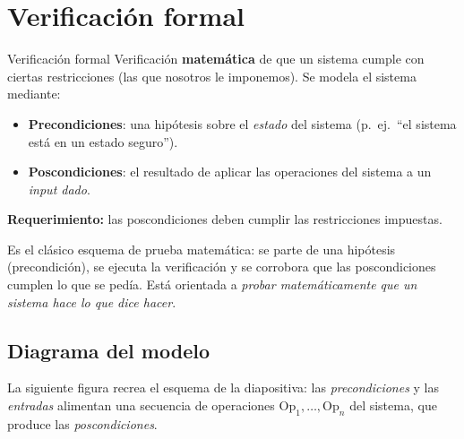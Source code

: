 \documentclass[11pt,a4paper]{article}
\begin{document}
\section{Verificación formal}

\begin{defbox}{Verificación formal}
Verificación \textbf{matemática} de que un sistema cumple con ciertas restricciones
(las que nosotros le imponemos). Se modela el sistema mediante:
\begin{itemize}[leftmargin=1.4em,itemsep=2pt]
  \item \textbf{Precondiciones}: una hipótesis sobre el \emph{estado} del sistema
        (p.\ ej.\ ``el sistema está en un estado seguro'').
  \item \textbf{Poscondiciones}: el resultado de aplicar las operaciones del sistema a un
        \emph{input dado}.
\end{itemize}
\textbf{Requerimiento:} las poscondiciones deben cumplir las restricciones impuestas.
\end{defbox}

Es el clásico esquema de prueba matemática: se parte de una hipótesis (precondición), se
ejecuta la verificación y se corrobora que las poscondiciones cumplen lo que se pedía. Está
orientada a \emph{probar matemáticamente que un sistema hace lo que dice hacer}.

\subsection*{Diagrama del modelo}

La siguiente figura recrea el esquema de la diapositiva: las \emph{precondiciones} y las
\emph{entradas} alimentan una secuencia de operaciones $\mathrm{Op}_1,\dots,\mathrm{Op}_n$
del sistema, que produce las \emph{poscondiciones}.

\begin{center}
\end{center}
\end{document}
